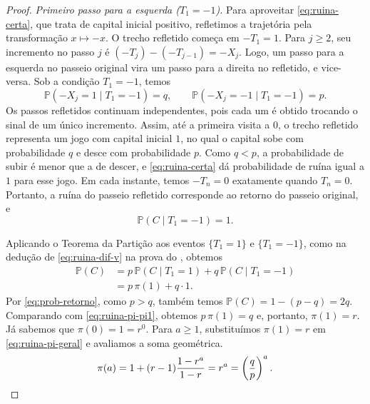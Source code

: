 \documentclass[12pt,portuguese]{article}
\theoremstyle{definition}
\theoremstyle{plainexercise}
\theoremstyle{starredexercise}
\theoremstyle{definition}
\begin{document}
\begin{proof}
  \smallskip
  \noindent\textit{Primeiro passo para a esquerda ($T_1 = -1$).}
  Para aproveitar \eqref{eq:ruina-certa}, que trata de capital inicial
  positivo, refletimos a trajetória pela transformação $x \mapsto -x$.
  O trecho refletido começa em $-T_1 = 1$. Para $j \geqslant 2$, seu
  incremento no passo $j$ é $(-T_j) - (-T_{j-1}) = -X_j$. Logo, um passo
  para a esquerda no passeio original vira um passo para a direita no
  refletido, e vice-versa. Sob a condição $T_1 = -1$, temos
  \[
    \mathbb{P}(-X_j = 1 \mid T_1 = -1) = q,
    \qquad
    \mathbb{P}(-X_j = -1 \mid T_1 = -1) = p.
  \]
  Os passos refletidos continuam independentes, pois cada um é obtido
  trocando o sinal de um único incremento. Assim, até a primeira visita a
  $0$, o trecho refletido representa um jogo com capital inicial $1$, no
  qual o capital sobe com probabilidade $q$ e desce com probabilidade $p$.
  Como $q < p$, a probabilidade de subir é menor que a de descer, e
  \eqref{eq:ruina-certa} dá probabilidade de ruína igual a $1$ para esse
  jogo. Em cada instante, temos $-T_n = 0$ exatamente quando $T_n = 0$.
  Portanto, a ruína do passeio refletido corresponde ao retorno do passeio
  original, e
  \[
    \mathbb{P}(C \mid T_1 = -1) = 1.
  \]

  Aplicando o Teorema da Partição aos eventos $\{T_1 = 1\}$ e $\{T_1 = -1\}$,
  como na dedução de \eqref{eq:ruina-dif-v} na prova do
  , obtemos
  \begin{equation}\label{eq:ruina-pi-pi1}
    \begin{aligned}
      \mathbb{P}(C)
      &= p\,\mathbb{P}(C \mid T_1 = 1) + q\,\mathbb{P}(C \mid T_1 = -1) \\
      &= p\,\pi(1) + q \cdot 1.
    \end{aligned}
  \end{equation}
  Por \eqref{eq:prob-retorno}, como $p > q$, também temos
  $\mathbb{P}(C) = 1 - (p - q) = 2q$. Comparando com \eqref{eq:ruina-pi-pi1},
  obtemos $p\,\pi(1) = q$ e, portanto, $\pi(1) = r$. Já sabemos que
  $\pi(0) = 1 = r^0$. Para $a \geqslant 1$, substituímos $\pi(1) = r$ em
  \eqref{eq:ruina-pi-geral} e avaliamos a soma geométrica.
  \[
    \pi(a) = 1 + (r - 1)\frac{1 - r^a}{1 - r} = r^a
    = \left(\frac{q}{p}\right)^a. \qedhere
  \]
\end{proof}
\end{document}
